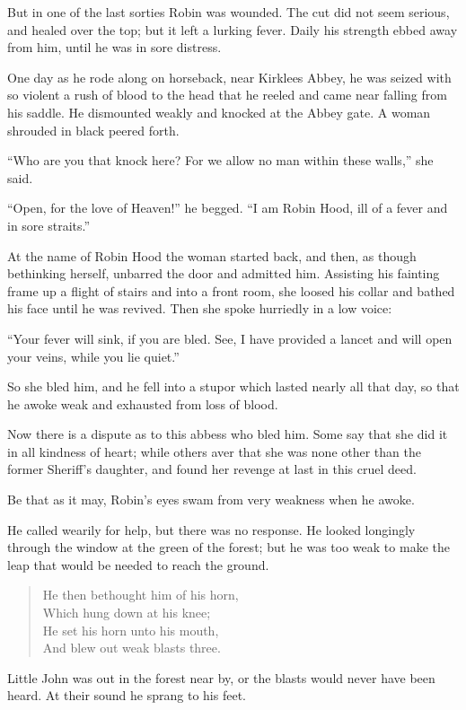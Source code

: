 But in one of the last sorties Robin was wounded. The cut did not seem
serious, and healed over the top; but it left a lurking fever. Daily his
strength ebbed away from him, until he was in sore distress.

One day as he rode along on horseback, near Kirklees Abbey, he was
seized with so violent a rush of blood to the head that he reeled and
came near falling from his saddle. He dismounted weakly and knocked at
the Abbey gate. A woman shrouded in black peered forth.

``Who are you that knock here? For we allow no man within these walls,''
she said.

``Open, for the love of Heaven!'' he begged. ``I am Robin Hood, ill of a
fever and in sore straits.''

At the name of Robin Hood the woman started back, and then, as though
bethinking herself, unbarred the door and admitted him. Assisting his
fainting frame up a flight of stairs and into a front room, she loosed
his collar and bathed his face until he was revived. Then she spoke
hurriedly in a low voice:

``Your fever will sink, if you are bled. See, I have provided a lancet
and will open your veins, while you lie quiet.''

So she bled him, and he fell into a stupor which lasted nearly all that
day, so that he awoke weak and exhausted from loss of blood.

Now there is a dispute as to this abbess who bled him. Some say that she
did it in all kindness of heart; while others aver that she was none
other than the former Sheriff's daughter, and found her revenge at last
in this cruel deed.

Be that as it may, Robin's eyes swam from very weakness when he awoke.

He called wearily for help, but there was no response. He looked
longingly through the window at the green of the forest; but he was too
weak to make the leap that would be needed to reach the ground.

\begin{quote}
He then bethought him of his horn,\\
Which hung down at his knee;\\
He set his horn unto his mouth,\\
And blew out weak blasts three.
\end{quote}

Little John was out in the forest near by, or the blasts would never
have been heard. At their sound he sprang to his feet.

